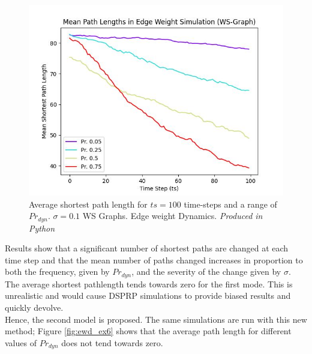 \documentclass[
	a4paper, %
	10pt, %
	unnumberedsections, %
	twoside, %
]{LTJournalArticle}
\begin{document}
\begin{figure}[H]
	\includegraphics[width=\linewidth]{Figures/ewd/ew1_length_prob.jpg}
	\caption{Average shortest path length for \(ts = 100\) time-steps and a range of \(Pr_{dyn}\). \(\sigma = 0.1\) WS Graphs. Edge weight Dynamics. \emph{Produced in Python}}
	\label{fig:ewd_ex4}
\end{figure}

Results show that a significant number of shortest paths are changed at each time step and that the mean number of paths changed increases in proportion to both the frequency, given by \(Pr_{dyn}\), and the severity of the change given by \(\sigma\). \\

The average shortest pathlength tends towards zero for the first mode. This is unrealistic and would cause DSPRP simulations to provide biased results and quickly devolve. \\

Hence, the second model is proposed. The same simulations are run with this new method; Figure \ref{fig:ewd_ex6} shows that the average path length for different values of \(Pr_{dyn}\) does not tend towards zero. \\
\end{document}
